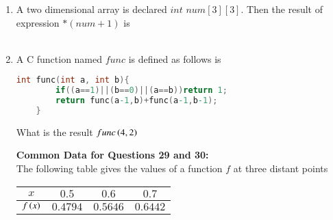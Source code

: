 \documentclass[journal]{IEEEtran}
\begin{document}
\begin{enumerate}
	\begin{enumerate}
\end{enumerate}
\item A two dimensional array is declared $int$ $num[3][3]$. Then the result of expression $*(num+1)$ is\\\\
	\begin{enumerate}
\end{enumerate}
\item A C function named $func$ is defined as follows is
\begin{lstlisting}[language=C]
    int func(int a, int b){
        if((a==1)||(b==0)||(a==b))return 1;
        return func(a-1,b)+func(a-1,b-1);
    }
\end{lstlisting}
	What is the result $func\left(4,2\right)$
	\begin{enumerate}
\end{enumerate}
\textbf{Common Data for Questions 29 and 30:}\\
The following table gives the values of a function $f$ at three distant points 
\begin{table}[h!]
\centering
\begin{tabular}{|c|c|c|c|}
\hline
$x$ & $0.5$ & $0.6$ & $0.7$ \\ \hline
	$f\left(x\right)$ & $0.4794$ & $0.5646$ & $0.6442$ \\ \hline
\end{tabular}
\end{table}


\end{enumerate}
\end{document}
